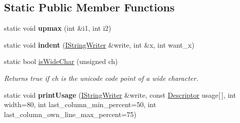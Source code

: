 \subsection*{Static Public Member Functions}
\begin{DoxyCompactItemize}
\item 
\hypertarget{structxmem_1_1config_1_1third__party_1_1_print_usage_implementation_a61c94ce9b05817ba381f67c876c31317}{static void {\bfseries upmax} (int \&i1, int i2)}\label{structxmem_1_1config_1_1third__party_1_1_print_usage_implementation_a61c94ce9b05817ba381f67c876c31317}

\item 
\hypertarget{structxmem_1_1config_1_1third__party_1_1_print_usage_implementation_a9282ea42ec7d06c6150b3b5e184c0916}{static void {\bfseries indent} (\hyperlink{structxmem_1_1config_1_1third__party_1_1_print_usage_implementation_1_1_i_string_writer}{I\-String\-Writer} \&write, int \&x, int want\-\_\-x)}\label{structxmem_1_1config_1_1third__party_1_1_print_usage_implementation_a9282ea42ec7d06c6150b3b5e184c0916}

\item 
static bool \hyperlink{structxmem_1_1config_1_1third__party_1_1_print_usage_implementation_a26b1905c90b5ccc4e8f1db6b5646fc6f}{is\-Wide\-Char} (unsigned ch)
\begin{DoxyCompactList}\small\item\em Returns true if ch is the unicode code point of a wide character. \end{DoxyCompactList}\item 
\hypertarget{structxmem_1_1config_1_1third__party_1_1_print_usage_implementation_ab74ee659e276695044e9fb4312c3cef9}{static void {\bfseries print\-Usage} (\hyperlink{structxmem_1_1config_1_1third__party_1_1_print_usage_implementation_1_1_i_string_writer}{I\-String\-Writer} \&write, const \hyperlink{structxmem_1_1config_1_1third__party_1_1_descriptor}{Descriptor} usage\mbox{[}$\,$\mbox{]}, int width=80, int last\-\_\-column\-\_\-min\-\_\-percent=50, int last\-\_\-column\-\_\-own\-\_\-line\-\_\-max\-\_\-percent=75)}\label{structxmem_1_1config_1_1third__party_1_1_print_usage_implementation_ab74ee659e276695044e9fb4312c3cef9}

\end{DoxyCompactItemize}


